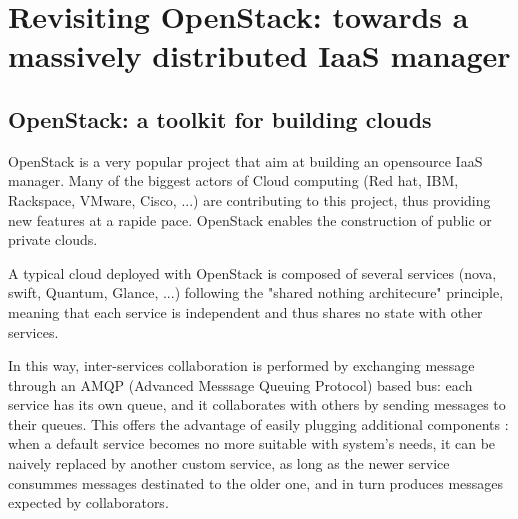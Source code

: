 \section{Revisiting OpenStack: towards a massively distributed IaaS manager}


\subsection{OpenStack: a toolkit for building clouds}

	





OpenStack is a very popular project that aim at building an opensource IaaS
manager. Many of the biggest actors of Cloud computing (Red hat, IBM, Rackspace,
VMware, Cisco, ...) are contributing to this project, thus providing new 
features at a rapide pace. OpenStack enables the construction of public or 
private clouds.

A typical cloud deployed with OpenStack is composed of several services (nova, 
swift, Quantum, Glance, ...) following the "shared nothing architecure" 
principle, meaning that each service is independent and thus shares no state 
with other services.

In this way, inter-services collaboration is performed by exchanging message 
through an AMQP (Advanced Messsage Queuing Protocol) based bus: each service 
has its own queue, and it collaborates with others by sending messages to their 
queues. This offers the advantage of easily plugging additional components : 
when a default service becomes no more suitable with system's needs, it can be 
naively replaced by another custom service, as long as the newer service 
consummes messages destinated to the older one, and in turn produces messages 
expected by collaborators.

